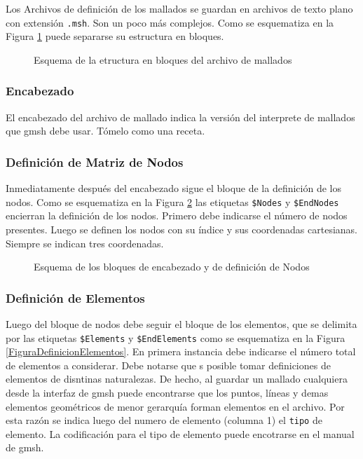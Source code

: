 Los Archivos de definición de los mallados se guardan en 
archivos de texto plano con extensión 
\texttt{.msh}. Son un poco más 
complejos. Como se esquematiza en la Figura 
\ref{FiguraEstructuraMallados} puede separarse su estructura
en bloques. 
\begin{figure}
  \caption{Esquema de la etructura en bloques del archivo
  de mallados\label{FiguraEstructuraMallados} }
\end{figure}

\subsubsection{Encabezado}

El encabezado del archivo de mallado indica la versión del 
interprete de mallados que gmsh debe usar. Tómelo como
una receta. 

\subsubsection{Definición de Matriz de Nodos}

Inmediatamente después del encabezado sigue el bloque de 
la definición de los nodos. Como se esquematiza en la 
Figura \ref{FiguraEncabezado} las etiquetas \texttt{\$Nodes} 
y \texttt{\$EndNodes} encierran la definición de los 
nodos. Primero debe indicarse el número de nodos 
presentes. Luego se definen los nodos con su índice y sus 
coordenadas cartesianas. Siempre se indican tres coordenadas. 

\begin{figure}
  \caption{ Esquema de los bloques de encabezado y de 
  definición de Nodos \label{FiguraEncabezado} }

\end{figure}

\subsubsection{Definición de Elementos}

Luego del bloque de nodos debe seguir el bloque de los 
elementos, que se delimita por las etiquetas 
\texttt{\$Elements} y \texttt{\$EndElements} como se 
esquematiza en la Figura \ref{FiguraDefinicionElementos}. En
primera instancia debe indicarse el número total de elementos 
a considerar. Debe notarse que s posible tomar definiciones
de elementos de disntinas naturalezas. De hecho, al guardar
un mallado cualquiera desde la interfaz de gmsh puede 
encontrarse que los puntos, líneas y demas elementos 
geométricos de menor gerarquía forman elementos en 
el archivo. Por esta razón se indica luego del numero de
elemento (columna 1) el \texttt{tipo} de elemento. La
codificación para el tipo de elemento puede encotrarse 
en el manual de gmsh. 

